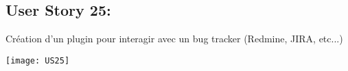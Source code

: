 \newpage{}
\subsection{User Story 25:}
Création d'un plugin pour interagir avec un bug tracker (Redmine, JIRA, etc...)


  \begin{center}
        \texttt{[image: US25]}
  \end{center}